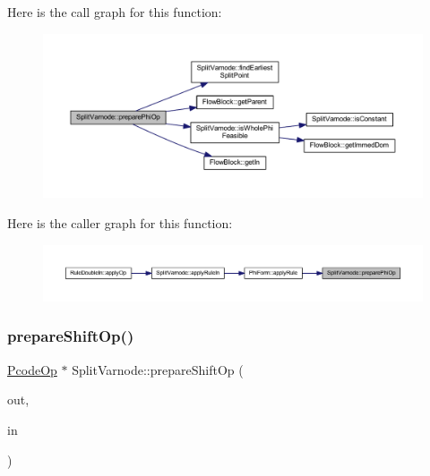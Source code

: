 Here is the call graph for this function\+:
\nopagebreak
\begin{figure}[H]
\begin{center}
\leavevmode
\includegraphics[width=350pt]{class_split_varnode_a1a67136592624e6bd5612cea36e891dd_cgraph}
\end{center}
\end{figure}
Here is the caller graph for this function\+:
\nopagebreak
\begin{figure}[H]
\begin{center}
\leavevmode
\includegraphics[width=350pt]{class_split_varnode_a1a67136592624e6bd5612cea36e891dd_icgraph}
\end{center}
\end{figure}
\mbox{\label{class_split_varnode_a5a10435148bcdd7f5e09cface0c1998f}} 
\subsubsection{\texorpdfstring{prepareShiftOp()}{prepareShiftOp()}}
{\footnotesize\ttfamily \mbox{\hyperlink{class_pcode_op}{Pcode\+Op}} $\ast$ Split\+Varnode\+::prepare\+Shift\+Op (\begin{DoxyParamCaption}\item[{\mbox{\hyperlink{class_split_varnode}{Split\+Varnode}} \&}]{out,  }\item[{\mbox{\hyperlink{class_split_varnode}{Split\+Varnode}} \&}]{in }\end{DoxyParamCaption})\hspace{0.3cm}{\ttfamily [static]}}



